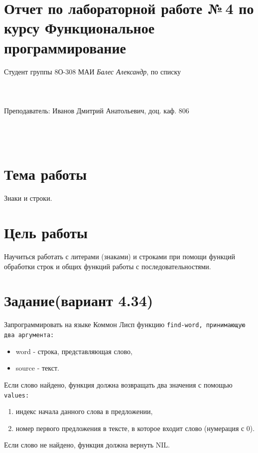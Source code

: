 \documentclass[12pt]{article}
\begin{document}
\section*{Отчет по лабораторной работе №\,4
по курсу \guillemotleft  Функциональное программирование\guillemotright}
\begin{flushright}
Студент группы 8О-308 МАИ \textit{Балес Александр},  по списку \\
 \\
 \\
\ \\
Преподаватель: Иванов Дмитрий Анатольевич, доц. каф. 806 \\
 \\
 \\
 \\

\end{flushright}

\section{Тема работы}
Знаки и строки.

\section{Цель работы}
Научиться работать с литерами (знаками) и строками при помощи функций обработки строк и общих функций работы с последовательностями.

\section{Задание(вариант 4.34)}
Запрограммировать на языке Коммон Лисп функцию \tt{find-word}, принимающую два аргумента:
\begin{itemize}
\item word - строка, представляющая слово,
\item source - текст.
\end{itemize}
Если слово найдено, функция должна возвращать два значения с помощью \tt{values}:
\begin{enumerate}
\item индекс начала данного слова в предложении,
\item номер первого предложения в тексте, в которое входит слово (нумерация с 0). 
\end{enumerate}
Если слово не найдено, функция должна вернуть NIL.
\end{document}

